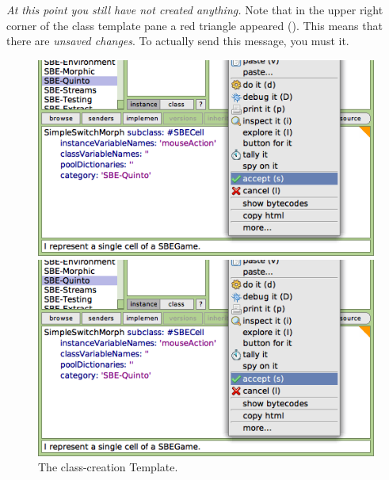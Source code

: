 \documentclass[a4paper,10pt,twoside]{book}
\begin{document}
\emph{At this point you still have not created anything.}
Note that in the upper right corner of the class template pane a red triangle appeared ().
This means that there are \emph{unsaved changes}.
To actually send this message, you must  it.

\begin{figure}[h!t]
\ifluluelse
	{\centerline {\includegraphics[width=\textwidth]{AcceptClassDef}}}
	{\centerline {\includegraphics[scale=0.7]{AcceptClassDef}}}
\caption{The class-creation Template.
\label{fig:acceptClassDef}}
\end{figure}
\end{document}
